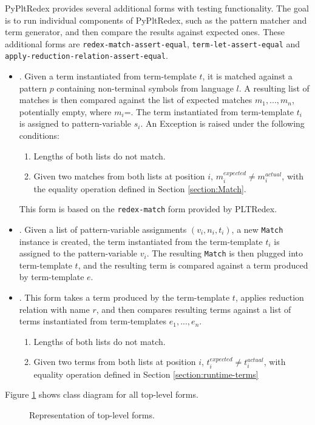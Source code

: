 PyPltRedex provides several additional forms with testing functionality. The goal is to run individual components of PyPltRedex, such as the pattern matcher and term generator, and then compare the results against expected ones. These additional forms are \texttt{redex-match-assert-equal}, \texttt{term-let-assert-equal} and \\ \texttt{apply-reduction-relation-assert-equal}.

\begin{itemize}
\item \RedexMatchAssertEqual. Given a term instantiated from term-template $t$, it is matched against a pattern $p$ containing non-terminal symbols from language $l$. A resulting list of matches is then compared against the list of expected matches $m_1,...,m_n$, potentially empty, where $m_i$=\Match. The term instantiated from term-template $t_i$ is assigned to pattern-variable $s_i$. An Exception is raised under the following conditions:
	\begin{enumerate}
	\item Lengths of both lists do not match.
	\item Given two matches from both lists at position $i$, $m_i^{expected} \neq m_i^{actual}$, with the equality operation defined in Section \ref{section:Match}.
	\end{enumerate}
	This form is based on the \texttt{redex-match} form provided by PLTRedex.

\item \TermLetAssertEqual. Given a list of pattern-variable assignments $(v_i, n_i, t_i)$, a new \texttt{Match} instance is created, the term instantiated from the term-template $t_i$ is assigned to the pattern-variable $v_i$. The resulting \texttt{Match} is then plugged into term-template $t$, and the resulting term is compared against a term produced by term-template $e$.

\item \ApplyReductionRelationAssertEqual. This form takes a term produced by the term-template $t$, applies reduction relation with name $r$, and then compares resulting terms against a list of terms instantiated from term-templates $e_1,...,e_n$.
	\begin{enumerate}
	\item Lengths of both lists do not match.
	\item Given two terms from both lists at position $i$, $t_i^{expected} \neq t_i^{actual}$, with equality operation defined in Section \ref{section:runtime-terms}
	\end{enumerate}
\end{itemize}

Figure \ref{class-diagram-toplevel} shows class diagram for all top-level forms.

\begin{figure}[htb]
	\centering
	\caption{Representation of top-level forms.}
\label{class-diagram-toplevel}
\end{figure}
